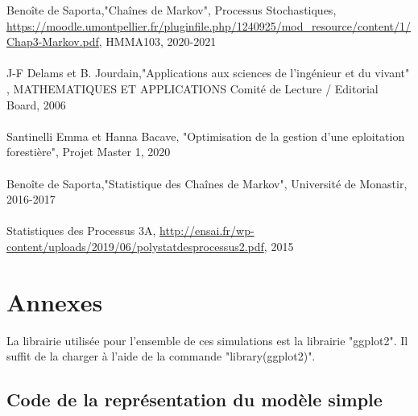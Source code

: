 \documentclass[12pt,a4paper]{report}
\theoremstyle{remark}
\begin{document}
\begin{thebibliography}{8}
 Benoîte de Saporta,{"Chaînes de Markov",  Processus Stochastiques, \url{https://moodle.umontpellier.fr/pluginfile.php/1240925/mod_resource/content/1/Chap3-Markov.pdf}, HMMA103, 2020-2021}
\\
\\
 J-F Delams et B. Jourdain,{"Applications aux sciences de l'ingénieur et du vivant" , MATHEMATIQUES ET APPLICATIONS Comité de Lecture / Editorial Board, 2006 }
\\
\\
 Santinelli Emma et Hanna Bacave, {"Optimisation de la gestion d'une eploitation forestière", Projet Master 1, 2020}
\\
\\
 Benoîte de Saporta,{"Statistique des Chaînes de Markov",  Université de Monastir, 2016-2017}
\\
\\
 Statistiques des Processus 3A, {\url{http://ensai.fr/wp-content/uploads/2019/06/polystatdesprocessus2.pdf}, 2015}
\end{thebibliography}


\chapter*{Annexes}
La librairie utilisée pour l'ensemble de ces simulations est la librairie "ggplot2". Il suffit de la charger à l'aide de la commande "library(ggplot2)".

\section*{Code de la représentation du modèle simple}
\end{document}
